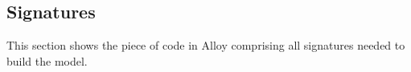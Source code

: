 \subsection{Signatures}

This section shows the piece of code in Alloy comprising all signatures needed to build the model.\\




